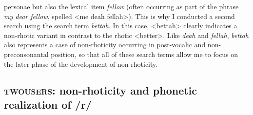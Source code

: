 personae but also the lexical item \emph{fellow} (often occurring as part of the phrase \emph{my dear fellow}, spelled <me deah fellah>). This is why I conducted a second search using the search term \emph{bettah}. In this case, <bettah> clearly indicates a non-rhotic variant in contrast to the rhotic <better>. Like \emph{deah} and \emph{fellah}, \emph{bettah} also represents a case of non-rhoticity occurring in post-vocalic and non-preconsonantal position, so that all of these search terms allow me to focus on the later phase of the development of non-rhoticity.

\subsection{\textsc{twousers}: non-rhoticity and phonetic realization of /r/}
\label{bkm:Ref11226173}\hypertarget{Toc63021227}{}
